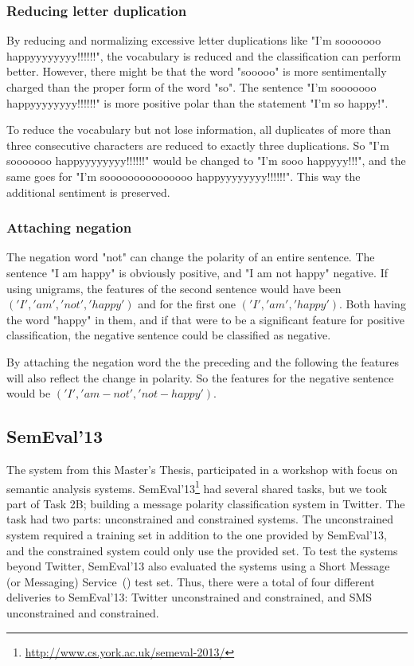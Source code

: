 \subsubsection{Reducing letter duplication}
By reducing and normalizing excessive letter duplications like "I'm sooooooo happyyyyyyyy!!!!!!", the vocabulary is reduced and the classification can perform better. However, there might be that the word "sooooo" is more sentimentally charged than the proper form of the word "so". The sentence "I'm sooooooo happyyyyyyyy!!!!!!" is more positive polar than the statement "I'm so happy!".

To reduce the vocabulary but not lose information, all duplicates of more than three consecutive characters are reduced to exactly three duplications. So "I'm sooooooo happyyyyyyyy!!!!!!" would be changed to "I'm sooo happyyy!!!", and the same goes for "I'm sooooooooooooooo happyyyyyyyy!!!!!!". This way the additional sentiment is preserved.

\subsubsection{Attaching negation}

The negation word "not" can change the polarity of an entire sentence. The sentence "I am happy" is obviously positive, and "I am not happy" negative. If using unigrams, the features of the second sentence would have been $('I', 'am', 'not', 'happy')$ and for the first one $('I', 'am', 'happy')$. Both having the word "happy" in them, and if that were to be a significant feature for positive classification, the negative sentence could be classified as negative.

By attaching the negation word the the preceding and the following the features will also reflect the change in polarity. So the features for the negative sentence would be $('I', 'am-not', 'not-happy')$.

\subsection{SemEval'13}

The system from this Master's Thesis, participated in a workshop with focus on semantic analysis systems. SemEval'13\footnote{\url{http://www.cs.york.ac.uk/semeval-2013/}} had several shared tasks, but we took part of Task 2B; building a message polarity classification system in Twitter. The task had two parts: unconstrained and constrained systems. The unconstrained system required a training set in addition to the one provided by SemEval'13, and the constrained system could only use the provided set. To test the systems beyond Twitter, SemEval'13 also evaluated the systems using a Short Message (or Messaging) Service~() test set. Thus, there were a total of four different deliveries to SemEval'13: Twitter unconstrained and constrained, and SMS unconstrained and constrained.

